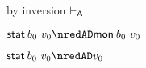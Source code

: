 {\begin{lamportproof*}
    \begin{pfproof}
        \begin{pfproof}
          by inversion $\vdash_{\mathsf{A}}$
        \end{pfproof}
      \qedstep
        \begin{pfproof}
          $\estab{\sbnd_0}{\svalue_0} \nredAD \emon{\sbnd_0}{\svalue_0}$
        \end{pfproof}
    \end{pfproof}

    \begin{pfproof}
      \qedstep
        \begin{pfproof}
          $\estab{\sbnd_0}{\svalue_0} \nredAD \svalue_0$
        \end{pfproof}
    \end{pfproof}

\end{lamportproof*}}

